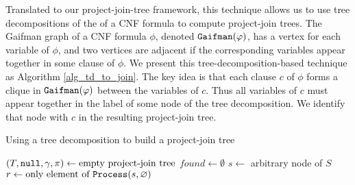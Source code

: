 Translated to our project-join-tree framework, this technique allows us to use tree decompositions of the  of a CNF formula to compute project-join trees.
The Gaifman graph of a CNF formula $\phi$, denoted $\texttt{\upshape Gaifman}(\varphi)$, has a vertex for each variable of $\phi$, and two vertices are adjacent if the corresponding variables appear together in some clause of $\phi$.
We present this tree-decomposition-based technique as Algorithm \ref{alg_td_to_join}.
The key idea is that each clause $c$ of $\phi$ forms a clique in $\texttt{\upshape Gaifman}(\varphi)$ between the variables of $c$.
Thus all variables of $c$ must appear together in the label of some node of the tree decomposition.
We identify that node with $c$ in the resulting project-join tree.
\begin{algorithm*}[t]
\label{alg_td_to_join}
\caption{Using a tree decomposition to build a project-join tree}
    \DontPrintSemicolon
    $(T, \texttt{\upshape null}, \gamma, \pi) \gets \text{empty project-join tree}$\;
    $found \gets \emptyset$
    $s \gets$ arbitrary node of $S$ \label{line_arbitrary_node}
    $r \gets \text{only element of}~\texttt{\upshape Process}(s, \varnothing)$\;
\end{algorithm*}

